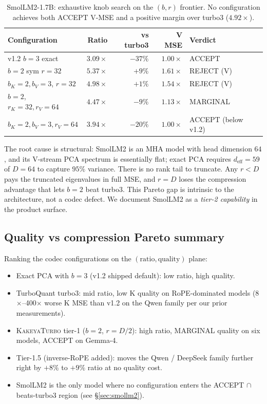 \documentclass[11pt,a4paper]{article}
\theoremstyle{definition}
\theoremstyle{plain}
\begin{document}
\begin{table}[H]
\centering
\small
\caption{SmolLM2-1.7B: exhaustive knob search on the $(b, r)$ frontier. No configuration achieves both ACCEPT V-MSE and a positive margin over turbo3 ($4.92\times$).}
\label{tab:smollm2}
\begin{tabular}{lrrrl}
  \toprule
  Configuration & Ratio & vs turbo3 & V MSE & Verdict \\
  \midrule
  v1.2 $b=3$ exact              & $3.09\times$ & $-37\%$ & $1.00\times$ & ACCEPT \\
  $b=2$ sym $r=32$              & $5.37\times$ & $+9\%$  & $1.61\times$ & REJECT (V) \\
  $b_K{=}2, b_V{=}3$, $r{=}32$  & $4.98\times$ & $+1\%$  & $1.54\times$ & REJECT (V) \\
  $b=2$, $r_K{=}32, r_V{=}64$   & $4.47\times$ & $-9\%$  & $1.13\times$ & MARGINAL \\
  $b_K{=}2,b_V{=}3, r_V{=}64$   & $3.94\times$ & $-20\%$ & $1.00\times$ & ACCEPT (below v1.2) \\
  \bottomrule
\end{tabular}
\end{table}

The root cause is structural: SmolLM2 is an MHA model with head dimension $64$, and its V-stream PCA spectrum is essentially flat; exact PCA requires $d_{\text{eff}} = 59$ of $D = 64$ to capture $95\%$ variance. There is no rank tail to truncate. Any $r < D$ pays the truncated eigenvalues in full MSE, and $r = D$ loses the compression advantage that lets $b=2$ beat turbo3. This Pareto gap is intrinsic to the architecture, not a codec defect. We document SmolLM2 as a \emph{tier-2 capability} in the product surface.

\subsection{Quality vs compression Pareto summary}

Ranking the codec configurations on the $(\text{ratio}, \text{quality})$ plane:
\begin{itemize}[leftmargin=*]
  \item Exact PCA with $b=3$ (v1.2 shipped default): low ratio, high quality.
  \item TurboQuant turbo3: mid ratio, low K quality on RoPE-dominated models (8$\times$--400$\times$ worse K MSE than v1.2 on the Qwen family per our prior measurements).
  \item \textsc{KakeyaTurbo} tier-1 ($b=2$, $r=D/2$): high ratio, MARGINAL quality on six models, ACCEPT on Gemma-4.
  \item Tier-1.5 (inverse-RoPE added): moves the Qwen / DeepSeek family further right by $+8\%$ to $+9\%$ ratio at no quality cost.
  \item SmolLM2 is the only model where no configuration enters the ACCEPT $\cap$ beats-turbo3 region (see \S\ref{sec:smollm2}).
\end{itemize}
\end{document}
